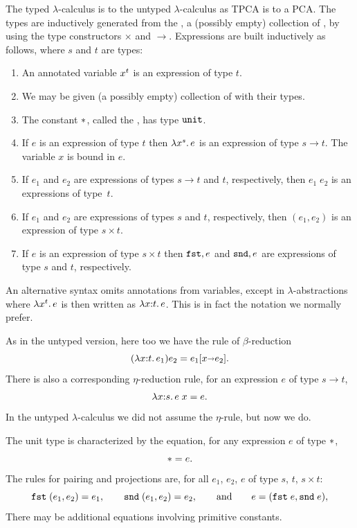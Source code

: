 The typed $\lambda$-calculus is to the untyped $\lambda$-calculus as
TPCA is to a PCA. The types are inductively generated from the
, a (possibly empty) collection of
, by using the type constructors $\times$ and
$\to$. Expressions are built inductively as follows, where $s$ and $t$
are types:
%
\begin{enumerate}
\item An annotated variable $x^{t}$ is an expression of type
  $t$.
\item We may be given (a possibly empty) collection of  with their types.
\item The constant ${*}$, called the , has type
  $\mathtt{unit}$.
\item If $e$ is an expression of type $t$ then
  $\lambda x^{s} .\,e$ is an expression of type $s \to t$. The
  variable $x$ is bound in $e$.
\item If $e_1$ and $e_2$ are expressions of types $s \to t$ and
  $t$, respectively, then $e_1\; e_2$ is an expressions of type~$t$.
\item If $e_1$ and $e_2$ are expressions of types $s$ and $t$,
  respectively, then $(e_1, e_2)$ is an expression of type $s \times
  t$.
\item If $e$ is an expression of type $s \times t$ then $\mathtt{fst},e$ and
  $\mathtt{snd},e$ are expressions of type $s$ and $t$, respectively.
\end{enumerate}
%
An alternative syntax omits annotations from variables, except in
$\lambda$-abstractions where $\lambda x^{t} .\,e$ is then written
as $\lambda x {:} t .\,e$. This is in fact the notation we normally prefer.

As in the untyped version, here too we have the rule of
$\beta$-reduction
%
\begin{equation*}
  (\lambda x {:} t .\,e_1) e_2 = e_1[x {\shortrightarrow} e_2].
\end{equation*}
%
There is also a corresponding $\eta$-reduction rule, for an expression
$e$ of type $s \to t$,
%
\begin{equation*}
  \lambda x {:} s .\,e\;x = e.
\end{equation*}
%
In the untyped $\lambda$-calculus we did not assume the $\eta$-rule,
but now we do.

The unit type is characterized by the equation, for any expression $e$
of type ${*}$,
%
\begin{equation*}
  {*} = e.
\end{equation*}
%
The rules for pairing and projections are, for all $e_1$, $e_2$, $e$
of type $s$, $t$, $s \times t$:
%
\begin{equation*}
  \mathtt{fst}\;(e_1, e_2) = e_1,
  \qquad
  \mathtt{snd}\;(e_1, e_2) = e_2,
  \qquad\text{and}\qquad
  e = (\mathtt{fst}\;e, \mathtt{snd}\;e),
\end{equation*}
%
There may be additional equations involving primitive constants.


